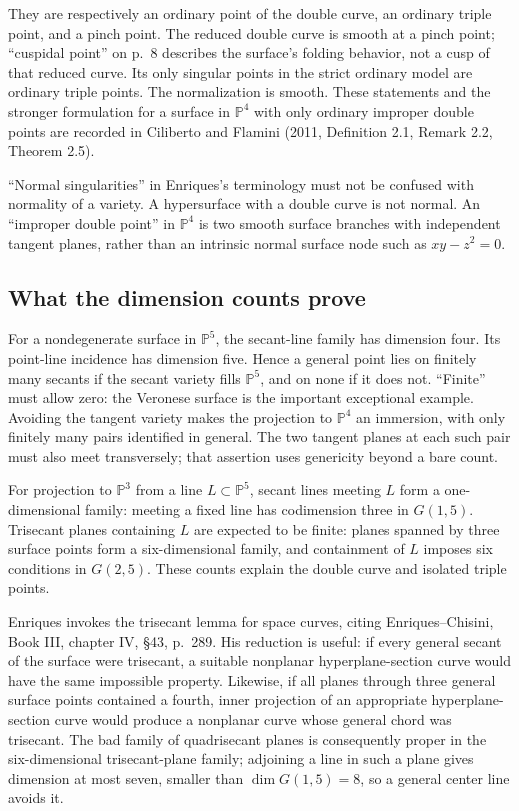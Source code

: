 They are respectively an ordinary point of the double curve, an ordinary triple point, and a pinch point. The reduced double curve is smooth at a pinch point; ``cuspidal point'' on p.~8 describes the surface's folding behavior, not a cusp of that reduced curve. Its only singular points in the strict ordinary model are ordinary triple points. The normalization is smooth. These statements and the stronger formulation for a surface in \(\mathbb P^4\) with only ordinary improper double points are recorded in Ciliberto and Flamini (2011, Definition 2.1, Remark 2.2, Theorem 2.5).

``Normal singularities'' in Enriques's terminology must not be confused with normality of a variety. A hypersurface with a double curve is not normal. An ``improper double point'' in \(\mathbb P^4\) is two smooth surface branches with independent tangent planes, rather than an intrinsic normal surface node such as \(xy-z^2=0\).

\subsection{What the dimension counts prove}

For a nondegenerate surface in \(\mathbb P^5\), the secant-line family has dimension four. Its point-line incidence has dimension five. Hence a general point lies on finitely many secants if the secant variety fills \(\mathbb P^5\), and on none if it does not. ``Finite'' must allow zero: the Veronese surface is the important exceptional example. Avoiding the tangent variety makes the projection to \(\mathbb P^4\) an immersion, with only finitely many pairs identified in general. The two tangent planes at each such pair must also meet transversely; that assertion uses genericity beyond a bare count.

For projection to \(\mathbb P^3\) from a line \(L\subset\mathbb P^5\), secant lines meeting \(L\) form a one-dimensional family: meeting a fixed line has codimension three in \(G(1,5)\). Trisecant planes containing \(L\) are expected to be finite: planes spanned by three surface points form a six-dimensional family, and containment of \(L\) imposes six conditions in \(G(2,5)\). These counts explain the double curve and isolated triple points.

Enriques invokes the trisecant lemma for space curves, citing Enriques--Chisini, Book III, chapter IV, §43, p.~289. His reduction is useful: if every general secant of the surface were trisecant, a suitable nonplanar hyperplane-section curve would have the same impossible property. Likewise, if all planes through three general surface points contained a fourth, inner projection of an appropriate hyperplane-section curve would produce a nonplanar curve whose general chord was trisecant. The bad family of quadrisecant planes is consequently proper in the six-dimensional trisecant-plane family; adjoining a line in such a plane gives dimension at most seven, smaller than \(\dim G(1,5)=8\), so a general center line avoids it.

